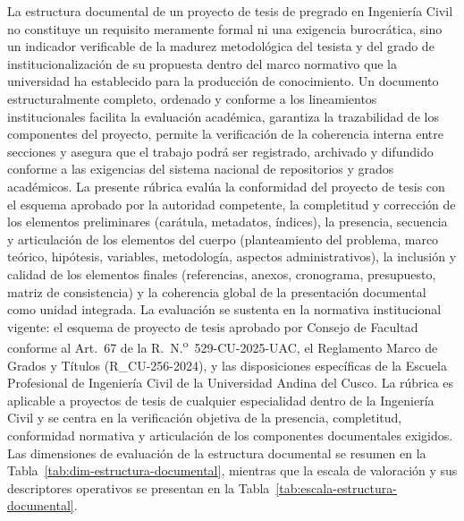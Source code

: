 \vspace{-6pt}
{\footnotesize\linespread{1}\selectfont
La estructura documental de un proyecto de tesis de pregrado en Ingeniería Civil no constituye un requisito meramente formal ni una exigencia burocrática, sino un indicador verificable de la madurez metodológica del tesista y del grado de institucionalización de su propuesta dentro del marco normativo que la universidad ha establecido para la producción de conocimiento. Un documento estructuralmente completo, ordenado y conforme a los lineamientos institucionales facilita la evaluación académica, garantiza la trazabilidad de los componentes del proyecto, permite la verificación de la coherencia interna entre secciones y asegura que el trabajo podrá ser registrado, archivado y difundido conforme a las exigencias del sistema nacional de repositorios y grados académicos. La presente rúbrica evalúa la conformidad del proyecto de tesis con el esquema aprobado por la autoridad competente, la completitud y corrección de los elementos preliminares (carátula, metadatos, índices), la presencia, secuencia y articulación de los elementos del cuerpo (planteamiento del problema, marco teórico, hipótesis, variables, metodología, aspectos administrativos), la inclusión y calidad de los elementos finales (referencias, anexos, cronograma, presupuesto, matriz de consistencia) y la coherencia global de la presentación documental como unidad integrada. La evaluación se sustenta en la normativa institucional vigente: el esquema de proyecto de tesis aprobado por Consejo de Facultad conforme al Art.~67 de la R.~N.\textsuperscript{o}~529-CU-2025-UAC, el Reglamento Marco de Grados y Títulos (R\_CU-256-2024), y las disposiciones específicas de la Escuela Profesional de Ingeniería Civil de la Universidad Andina del Cusco. La rúbrica es aplicable a proyectos de tesis de cualquier especialidad dentro de la Ingeniería Civil y se centra en la verificación objetiva de la presencia, completitud, conformidad normativa y articulación de los componentes documentales exigidos. Las dimensiones de evaluación de la estructura documental se resumen en la Tabla~\ref{tab:dim-estructura-documental}, mientras que la escala de valoración y sus descriptores operativos se presentan en la Tabla~\ref{tab:escala-estructura-documental}.\par
}

